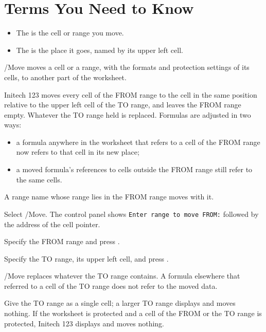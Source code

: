 \section{Terms You Need to Know}
\begin{itemize}
\item The  is the cell or range you move.
\item The  is the place it goes, named by its upper left
  cell.
\end{itemize}

/Move moves a cell or a range, with the formats and protection settings of
its cells, to another part of the worksheet.

Initech 123 moves every cell of the FROM range to the cell in the same
position relative to the upper left cell of the TO range, and leaves the
FROM range empty.  Whatever the TO range held is replaced.  Formulas are
adjusted in two ways:
\begin{itemize}
\item a formula anywhere in the worksheet that refers to a cell of the FROM
  range now refers to that cell in its new place;
\item a moved formula's references to cells outside the FROM range still
  refer to the same cells.
\end{itemize}
A range name whose range lies in the FROM range moves with it.

\begin{Steps123}
\item Select /Move.  The control panel shows
  \texttt{Enter range to move FROM:} followed by the address of the cell
  pointer.
\item Specify the FROM range and press .
\item Specify the TO range, its upper left cell, and press .
\end{Steps123}


\begin{Caution}
/Move replaces whatever the TO range contains.  A formula elsewhere that
referred to a cell of the TO range does not refer to the moved data.
\end{Caution}

\begin{Note}
Give the TO range as a single cell; a larger TO range displays
 and moves nothing.  If the
worksheet is protected and a cell of the FROM or the TO range is
protected, Initech 123 displays  and moves nothing.
\end{Note}

